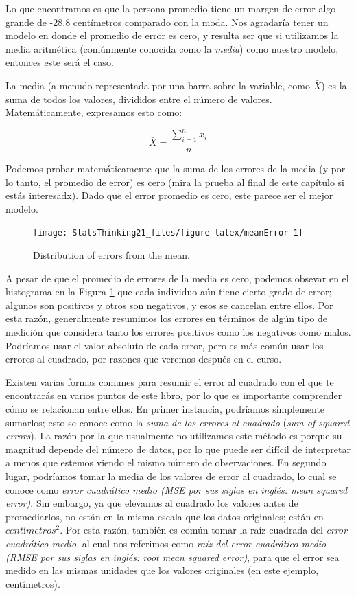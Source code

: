 \documentclass[
  12pt,
]{book}
\begin{document}
Lo que encontramos es que la persona promedio tiene un margen de error algo grande de -28.8 centímetros comparado con la moda. Nos agradaría tener un modelo en donde el promedio de error es cero, y resulta ser que si utilizamos la media aritmética (comúnmente conocida como la \emph{media}) como nuestro modelo, entonces este será el caso.

La media (a menudo representada por una barra sobre la variable, como \(\bar{X}\)) es la suma de todos los valores, divididos entre el número de valores. Matemáticamente, expresamos esto como:

\[
\bar{X} = \frac{\sum_{i=1}^{n}x_i}{n}
\]

Podemos probar matemáticamente que la suma de los errores de la media (y por lo tanto, el promedio de error) es cero (mira la prueba al final de este capítulo si estás interesadx). Dado que el error promedio es cero, este parece ser el mejor modelo.

\begin{figure}
\texttt{[image: StatsThinking21\_files/figure-latex/meanError-1]} \caption{Distribution of errors from the mean.}\label{fig:meanError}
\end{figure}

A pesar de que el promedio de errores de la media es cero, podemos obsevar en el histograma en la Figura \ref{fig:meanError} que cada individuo aún tiene cierto grado de error; algunos son positivos y otros son negativos, y esos se cancelan entre ellos. Por esta razón, generalmente resumimos los errores en términos de algún tipo de medición que considera tanto los errores positivos como los negativos como malos. Podríamos usar el valor absoluto de cada error, pero es más común usar los errores al cuadrado, por razones que veremos después en el curso.

Existen varias formas comunes para resumir el error al cuadrado con el que te encontrarás en varios puntos de este libro, por lo que es importante comprender cómo se relacionan entre ellos. En primer instancia, podríamos simplemente sumarlos; esto se conoce como la \emph{suma de los errores al cuadrado} (\emph{sum of squared errors}). La razón por la que usualmente no utilizamos este método es porque su magnitud depende del número de datos, por lo que puede ser difícil de interpretar a menos que estemos viendo el mismo número de observaciones. En segundo lugar, podríamos tomar la media de los valores de error al cuadrado, lo cual se conoce como \emph{error cuadrático medio (MSE por sus siglas en inglés: mean squared error)}. Sin embargo, ya que elevamos al cuadrado los valores antes de promediarlos, no están en la misma escala que los datos originales; están en \(centímetros^2\). Por esta razón, también es común tomar la raíz cuadrada del \emph{error cuadrático medio}, al cual nos referimos como \emph{raíz del error cuadrático medio (RMSE por sus siglas en inglés: root mean squared error)}, para que el error sea medido en las mismas unidades que los valores originales (en este ejemplo, centímetros).
\end{document}
